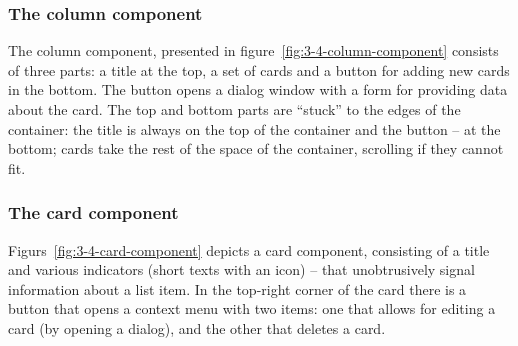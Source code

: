 \subsubsection{The column component}
The column component, presented in figure~\ref{fig:3-4-column-component} consists of three parts: a title at the top, a set of cards and a button for adding new cards in the bottom.
The button opens a dialog window with a form for providing data about the card.
The top and bottom parts are \enquote{stuck} to the edges of the container: the title is always on the top of the container and the button -- at the bottom;
cards take the rest of the space of the container, scrolling if they cannot fit.

\subsubsection{The card component}
Figurs~\ref{fig:3-4-card-component} depicts a card component, consisting of a title and various indicators (short texts with an icon) -- that unobtrusively signal information about a list item.
In the top-right corner of the card there is a button that opens a context menu with two items: one that allows for editing a card (by opening a dialog), and the other that deletes a card.

